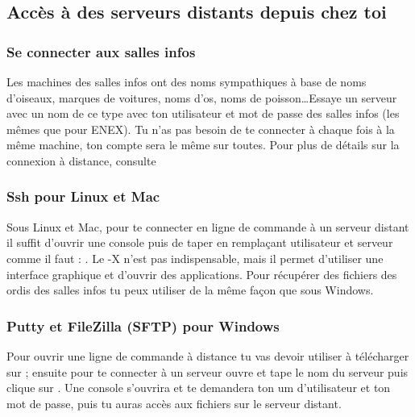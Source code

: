 \subsection{Acc\`es \`a des serveurs distants depuis chez toi}

\subsubsection{Se connecter aux salles infos}

Les machines des salles infos ont des noms sympathiques \`a base de noms d'oiseaux, marques de voitures, noms d'os, noms de poisson\dots Essaye un serveur avec un nom de ce type avec ton utilisateur et mot de passe des salles infos (les m\^emes que pour ENEX). Tu n'as pas besoin de te connecter \`a chaque fois \`a la m\^eme machine, ton compte sera le m\^eme sur toutes. Pour plus de d\'etails sur la connexion \`a distance, consulte \newline {} 



\subsubsection{Ssh pour Linux et Mac}

Sous Linux et Mac, pour te connecter en ligne de commande \`a un serveur distant il suffit d'ouvrir une console puis de taper en rempla\c{c}ant utilisateur et serveur comme il faut : . Le -X n'est pas indispensable, mais il permet d'utiliser une interface graphique et d'ouvrir des applications. Pour r\'ecup\'erer des fichiers des ordis des salles infos tu peux utiliser  de la m\^eme fa\c{c}on que sous Windows.

\subsubsection{Putty et FileZilla (SFTP) pour Windows}

Pour ouvrir une ligne de commande \`a distance tu vas devoir utiliser  \`a t\'el\'echarger sur  ;
ensuite pour te connecter \`a un serveur ouvre  et tape le nom du serveur puis clique sur .
Une console s'ouvrira et te demandera ton um d'utilisateur et ton mot de passe, puis tu auras acc\`es aux fichiers sur le serveur distant.

